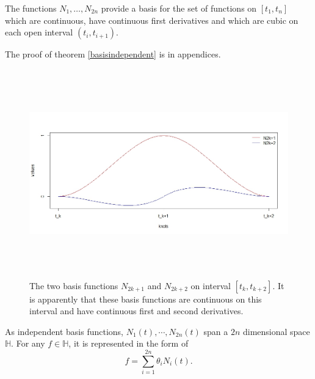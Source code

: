\begin{theorem}\label{basisindependent}
The functions $N_1,\ldots,N_{2n}$ provide a basis for the set of functions on $[t_1,t_n]$  which are continuous, have continuous first derivatives and which are 
cubic on each open interval $(t_i,t_{i+1})$.
\end{theorem}

The proof of theorem \ref{basisindependent} is in appendices. 

\begin{figure}[t] \centering
\includegraphics[width=\textwidth, height=9cm]{n2i}
\small \caption{The two basis functions $N_{2k+1}$ and $N_{2k+2}$ on interval $[t_k, t_{k+2}]$. It is apparently that these basis functions are continuous on this interval and have continuous first and second derivatives.}
\end{figure}

As independent basis functions, $N_1(t), \cdots, N_{2n}(t)$ span a $2n$ dimensional space $\mathbb{H}$. For any $f \in \mathbb{H}$, it is represented in the form of
\begin{equation}
f=\sum_{i=1}^{2n} \theta_i N_i(t).
\end{equation}

